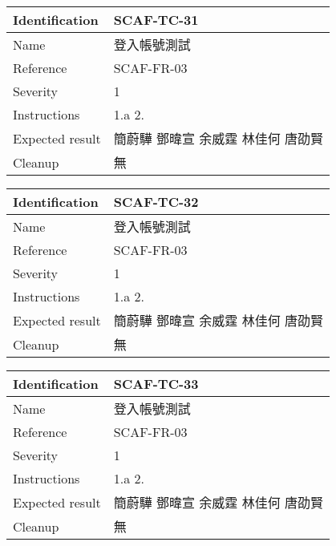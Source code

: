 \documentclass{report}
\begin{document}
\begin{tabularx}{0.9\textwidth}{
  |p{}%
  |p{}|%
  }
  \hline
  \centering Identification &  SCAF-TC-31 \\
  \hline
  \centering Name & 登入帳號測試 \\
  \hline
  \centering Reference & SCAF-FR-03 \\
  \hline
  \centering Severity & 1 \\
  \hline
  \centering Instructions & 1.a
                            2. \\
  \hline
  \centering Expected result & 簡蔚驊 \! 鄧暐宣 \! 余威霆 \! 林佳何 \! 唐劭賢 \\
  \hline
  \centering Cleanup & 無 \\
  \hline
\end{tabularx}
\newline\newline

\begin{tabularx}{0.9\textwidth}{
  |p{}%
  |p{}|%
  }
  \hline
  \centering Identification &  SCAF-TC-32 \\
  \hline
  \centering Name & 登入帳號測試 \\
  \hline
  \centering Reference & SCAF-FR-03 \\
  \hline
  \centering Severity & 1 \\
  \hline
  \centering Instructions & 1.a
                            2. \\
  \hline
  \centering Expected result & 簡蔚驊 \! 鄧暐宣 \! 余威霆 \! 林佳何 \! 唐劭賢 \\
  \hline
  \centering Cleanup & 無 \\
  \hline
\end{tabularx}
\newline\newline

\begin{tabularx}{0.9\textwidth}{
  |p{}%
  |p{}|%
  }
  \hline
  \centering Identification &  SCAF-TC-33 \\
  \hline
  \centering Name & 登入帳號測試 \\
  \hline
  \centering Reference & SCAF-FR-03 \\
  \hline
  \centering Severity & 1 \\
  \hline
  \centering Instructions & 1.a
                            2. \\
  \hline
  \centering Expected result & 簡蔚驊 \! 鄧暐宣 \! 余威霆 \! 林佳何 \! 唐劭賢 \\
  \hline
  \centering Cleanup & 無 \\
  \hline
\end{tabularx}
\newline\newline
\end{document}
